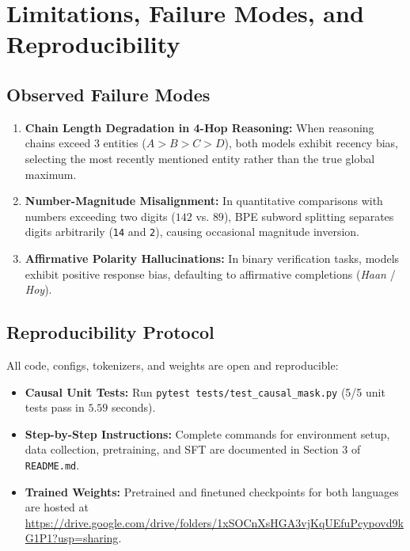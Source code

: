 \documentclass[11pt,a4paper]{article}
\begin{document}
\section{Limitations, Failure Modes, and Reproducibility}

\subsection{Observed Failure Modes}
\begin{enumerate}[noitemsep]
    \item \textbf{Chain Length Degradation in 4-Hop Reasoning:} When reasoning chains exceed 3 entities ($A > B > C > D$), both models exhibit recency bias, selecting the most recently mentioned entity rather than the true global maximum.
    \item \textbf{Number-Magnitude Misalignment:} In quantitative comparisons with numbers exceeding two digits ($142$ vs. $89$), BPE subword splitting separates digits arbitrarily (\texttt{14} and \texttt{2}), causing occasional magnitude inversion.
    \item \textbf{Affirmative Polarity Hallucinations:} In binary verification tasks, models exhibit positive response bias, defaulting to affirmative completions (\textit{Haan} / \textit{Hoy}).
\end{enumerate}

\subsection{Reproducibility Protocol}
All code, configs, tokenizers, and weights are open and reproducible:
\begin{itemize}[noitemsep]
    \item \textbf{Causal Unit Tests:} Run \texttt{pytest tests/test\_causal\_mask.py} (5/5 unit tests pass in $5.59$ seconds).
    \item \textbf{Step-by-Step Instructions:} Complete commands for environment setup, data collection, pretraining, and SFT are documented in Section 3 of \texttt{README.md}.
    \item \textbf{Trained Weights:} Pretrained and finetuned checkpoints for both languages are hosted at \url{https://drive.google.com/drive/folders/1xSOCnXsHGA3vjKqUEfuPcypovd9kG1P1?usp=sharing}.
\end{itemize}
\end{document}
